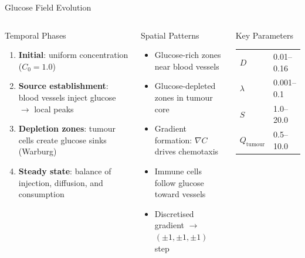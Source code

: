 \documentclass[aspectratio=169,10pt]{beamer}
\begin{document}
\begin{frame}{Glucose Field Evolution}
  \begin{columns}[T]
    \begin{block}{Temporal Phases}
      \begin{enumerate}
        \item \textbf{Initial}: uniform concentration ($C_0 = 1.0$)
        \item \textbf{Source establishment}: blood vessels inject glucose $\to$ local peaks
        \item \textbf{Depletion zones}: tumour cells create glucose sinks (Warburg)
        \item \textbf{Steady state}: balance of injection, diffusion, and consumption
      \end{enumerate}
    \end{block}

    \begin{block}{Spatial Patterns}
      \begin{itemize}
        \item Glucose-rich zones near blood vessels
        \item Glucose-depleted zones in tumour core
        \item Gradient formation: $\nabla C$ drives chemotaxis
        \item Immune cells follow glucose toward vessels
        \item Discretised gradient $\to$ $(\pm 1, \pm 1, \pm 1)$ step
      \end{itemize}
    \end{block}

    \begin{block}{Key Parameters}
      \small
      \begin{tabular}{@{}ll@{}}
        $D$ & 0.01--0.16 \\
        $\lambda$ & 0.001--0.1 \\
        $S$ & 1.0--20.0 \\
        $Q_\text{tumour}$ & 0.5--10.0 \\
      \end{tabular}
    \end{block}
  \end{columns}
\end{frame}
\end{document}
